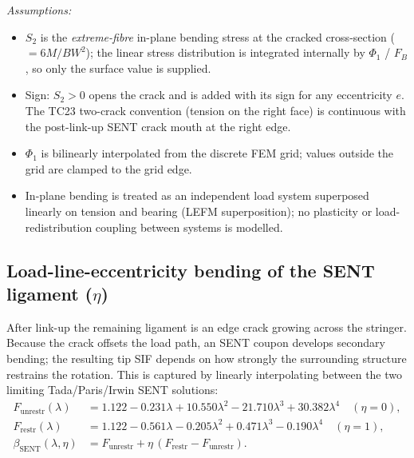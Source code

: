 \documentclass[11pt]{article}
\newenvironment{assume}{\par\smallskip\noindent\textit{Assumptions:}\begin{itemize}[leftmargin=1.5em,topsep=2pt,itemsep=1pt]}{\end{itemize}\par\smallskip}
\begin{document}
\begin{assume}
\item $S_2$ is the \emph{extreme-fibre} in-plane bending stress at the cracked
  cross-section ($=6M/BW^2$); the linear stress distribution is integrated
  internally by $\Phi_1$ / $F_B$, so only the surface value is supplied.
\item Sign: $S_2>0$ opens the crack and is added with its sign for any
  eccentricity $e$. The TC23 two-crack convention (tension on the right face)
  is continuous with the post-link-up SENT crack mouth at the right edge.
\item $\Phi_1$ is bilinearly interpolated from the discrete FEM grid; values
  outside the grid are clamped to the grid edge.
\item In-plane bending is treated as an independent load system superposed
  linearly on tension and bearing (LEFM superposition); no plasticity or
  load-redistribution coupling between systems is modelled.
\end{assume}

\subsection{Load-line-eccentricity bending of the SENT ligament ($\eta$)}
After link-up the remaining ligament is an edge crack growing across the
stringer. Because the crack offsets the load path, an SENT coupon develops
secondary bending; the resulting tip SIF depends on how strongly the
surrounding structure restrains the rotation. This is captured by linearly
interpolating between the two limiting Tada/Paris/Irwin SENT solutions:
\begin{align}
F_{\text{unrestr}}(\lambda) &= 1.122-0.231\lambda+10.550\lambda^2-21.710\lambda^3+30.382\lambda^4 \quad(\eta=0),\\
F_{\text{restr}}(\lambda)   &= 1.122-0.561\lambda-0.205\lambda^2+0.471\lambda^3-0.190\lambda^4 \quad(\eta=1),\\
\beta_{\text{SENT}}(\lambda,\eta) &= F_{\text{unrestr}} + \eta\,(F_{\text{restr}}-F_{\text{unrestr}}).
\label{eq:bsent}
\end{align}
\end{document}
